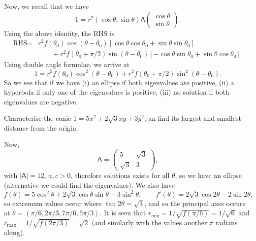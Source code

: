 \documentclass[10pt,notitlepage]{revtex4-1}
\newenvironment{example}[1][Example]{\begin{trivlist}
\item[\hskip \labelsep {\bfseries #1}]}{\end{trivlist}}
\begin{document}
Now, we recall that we have
\begin{equation}
	1=r^2(\cos\theta,\sin\theta)\mathsf{A}
	\begin{pmatrix}\cos\theta \\ \sin\theta\end{pmatrix}.
\end{equation}
Using the above identity, the RHS is
\begin{equation}\begin{aligned}
	\mbox{RHS}=&r^2 f(\theta_0)\cos(\theta-\theta_0)
	[\cos\theta\cos\theta_0 + \sin\theta\sin\theta_0]\\
	&\qquad+ r^2 f(\theta_0+\pi/2)\sin(\theta-\theta_0)
	[-\cos\theta\sin\theta_0 + \sin\theta\cos\theta_0].
\end{aligned}\end{equation}
Using double angle formulae, we arrive at
\begin{equation}
	1=r^2 f(\theta_0)\cos^2(\theta-\theta_0) 
	+r^2 f(\theta_0+\pi/2)\sin^2(\theta-\theta_0).
\end{equation}
So we see that if we have (i) an ellipse if both eigenvalues are positive, (ii)
a hyperbola if only one of the eigenvalues is positive, (iii) no solution if
both eigenvalues are negative.

\begin{example}
	Characterise the conic $1=5x^2 + 2\sqrt{3} xy + 3y^2$, an find its largest
	and smallest distance from the origin.
	
	Now,
	\begin{equation}
		\mathsf{A}=\begin{pmatrix}5 & \sqrt{3}\\ \sqrt{3} & 3\end{pmatrix},
	\end{equation}
	with $|\mathsf{A}|=12$, $a,c>0$, therefore solutions exists for all
	$\theta$, so we have an ellipse (alternative we could find the eigenvalues).
	We also have
	\begin{equation}
	 	f(\theta)=5\cos^2\theta+2\sqrt{3}\cos\theta\sin\theta+3\sin^2\theta,
	 	\qquad
	 	f'(\theta)=2\sqrt{3}\cos2\theta-2\sin2\theta,
	 \end{equation}
	 so extremum values occur where $\tan2\theta=\sqrt{3}$, and so the principal
	 axes occurs at $\theta=(\pi/6,2\pi/3,7\pi/6,5\pi/3)$. It is seen that
	 $r_{\min}=1/\sqrt{f(\pi/6)}=1/\sqrt{6}$ and
	 $r_{\max}=1/\sqrt{f(2\pi/3)}=\sqrt{2}$ (and similarly with the values
	 another $\pi$ radians along).
\end{example}
\end{document}
